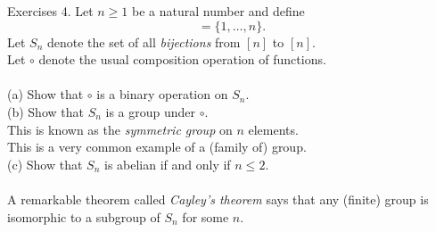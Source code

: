 \documentclass[handout, dvipsnames]{beamer}
\theoremstyle{definition}
\begin{document}
\begin{frame}{Exercises}
    4. Let $n \ge 1$ be a natural number and define 
    \begin{equation*} 
        [n] = \{1, \ldots, n\}.
    \end{equation*}
    Let $S_n$ denote the set of all \emph{bijections} from $[n]$ to $[n].$\\
    Let $\circ$ denote the usual composition operation of functions.\\~\\
    (a) Show that $\circ$ is a binary operation on $S_n.$\\
    (b) Show that $S_n$ is a group under $\circ.$\\
    This is known as the \emph{symmetric group} on $n$ elements.\\
    This is a very common example of a (family of) group.\\
    (c) Show that $S_n$ is abelian if and only if $n \le 2.$\\~\\
    A remarkable theorem called \emph{Cayley's theorem} says that any (finite) group is isomorphic to a subgroup of $S_n$ for some $n.$
\end{frame}
\end{document}
